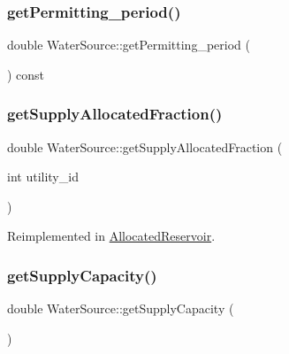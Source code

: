 \mbox{\label{classWaterSource_aa21d3f1c87ced40c2b673d9e43d99176}} 
\subsubsection{\texorpdfstring{get\+Permitting\+\_\+period()}{getPermitting\_period()}}
{\footnotesize\ttfamily double Water\+Source\+::get\+Permitting\+\_\+period (\begin{DoxyParamCaption}{ }\end{DoxyParamCaption}) const}

\mbox{\label{classWaterSource_a71cb8bd481bbce0089aa78dcd1c3309a}} 
\subsubsection{\texorpdfstring{get\+Supply\+Allocated\+Fraction()}{getSupplyAllocatedFraction()}}
{\footnotesize\ttfamily double Water\+Source\+::get\+Supply\+Allocated\+Fraction (\begin{DoxyParamCaption}\item[{int}]{utility\+\_\+id }\end{DoxyParamCaption})\hspace{0.3cm}{\ttfamily [virtual]}}



Reimplemented in \mbox{\hyperlink{classAllocatedReservoir_a114e9cde6a106b786ca0ed39283cbbed}{Allocated\+Reservoir}}.

\mbox{\label{classWaterSource_aa4cbbd1ee0fc5ea9291eb5d8067b3aa0}} 
\subsubsection{\texorpdfstring{get\+Supply\+Capacity()}{getSupplyCapacity()}}
{\footnotesize\ttfamily double Water\+Source\+::get\+Supply\+Capacity (\begin{DoxyParamCaption}{ }\end{DoxyParamCaption})\hspace{0.3cm}{\ttfamily [virtual]}}

